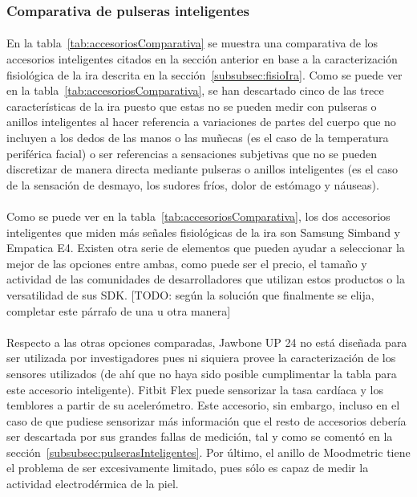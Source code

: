 \subsubsection{Comparativa de pulseras inteligentes}
\paragraph{}
En la tabla~\ref{tab:accesoriosComparativa} se muestra una comparativa de los accesorios inteligentes citados en la sección anterior en base a la caracterización fisiológica de la ira descrita en la sección~\ref{subsubsec:fisioIra}. Como se puede ver en la tabla~\ref{tab:accesoriosComparativa}, se han descartado cinco de las trece características de la ira puesto que estas no se pueden medir con pulseras o anillos inteligentes al hacer referencia a variaciones de partes del cuerpo que no incluyen a los dedos de las manos o las muñecas (es el caso de la temperatura periférica facial) o ser referencias a sensaciones subjetivas que no se pueden discretizar de manera directa mediante pulseras o anillos inteligentes (es el caso de la sensación de desmayo, los sudores fríos, dolor de estómago y náuseas).

\paragraph{}
Como se puede ver en la tabla~\ref{tab:accesoriosComparativa}, los dos accesorios inteligentes que miden más señales fisiológicas de la ira son Samsung Simband y Empatica E4. Existen otra serie de elementos que pueden ayudar a seleccionar la mejor de las opciones entre ambas, como puede ser el precio, el tamaño y actividad de las comunidades de desarrolladores que utilizan estos productos o la versatilidad de sus \ac{SDK}. [TODO: según la solución que finalmente se elija, completar este párrafo de una u otra manera]

\paragraph{}
Respecto a las otras opciones comparadas, Jawbone UP 24 no está diseñada para ser utilizada por investigadores pues ni siquiera provee la caracterización de los sensores utilizados (de ahí que no haya sido posible cumplimentar la tabla para este accesorio inteligente). Fitbit Flex puede sensorizar la tasa cardíaca y los temblores a partir de su acelerómetro. Este accesorio, sin embargo, incluso en el caso de que pudiese sensorizar más información que el resto de accesorios debería ser descartada por sus grandes fallas de medición, tal y como se comentó en la sección~\ref{subsubsec:pulserasInteligentes}. Por último, el anillo de Moodmetric tiene el problema de ser excesivamente limitado, pues sólo es capaz de medir la actividad electrodérmica de la piel.

